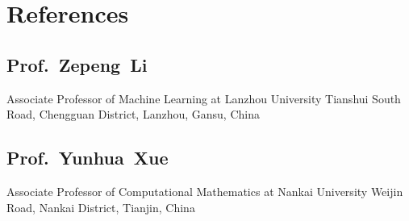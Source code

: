 \documentclass[11pt,a4paper, final]{moderncv}
\newcommand{\spacesubsection}{\vspace{0.2cm}}
\begin{document}
\section{\textbf{References}}
	\spacesubsection
	\subsection{\textbf{Prof.~Zepeng~Li}}
		\cvline{}
		{Associate Professor of Machine Learning at Lanzhou University}
		{Tianshui South Road, Chengguan District, Lanzhou, Gansu, China}
	\spacesubsection
	\subsection{\textbf{Prof.~Yunhua~Xue}}
		\cvline{}
		{Associate Professor of Computational Mathematics at Nankai University}
		{Weijin Road, Nankai District, Tianjin, China}





\clearpage
\end{document}
